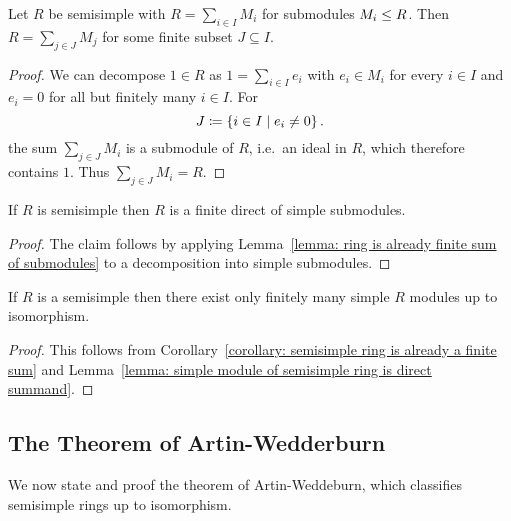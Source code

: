 \begin{lemma}
  \label{lemma: ring is already finite sum of submodules}
  Let $R$ be semisimple with $R = \sum_{i \in I} M_i$ for submodules $M_i \leq R$.
  Then $R = \sum_{j \in J} M_j$ for some finite subset $J \subseteq I$.
\end{lemma}


\begin{proof}
  We can decompose $1 \in R$ as $1 = \sum_{i \in I} e_i$ with $e_i \in M_i$ for every $i \in I$ and $e_i = 0$ for all but finitely many $i \in I$.
  For
  \[
              J
    \coloneqq  \{ i \in I \mid e_i \neq 0 \} \,.
  \]
  the sum $\sum_{j \in J} M_i$ is a submodule of $R$, i.e.\ an ideal in $R$, which therefore contains $1$.
  Thus $\sum_{j \in J} M_i = R$.
\end{proof}


\begin{corollary}
  \label{corollary: semisimple ring is already a finite sum}
  If $R$ is semisimple then $R$ is a finite direct of simple submodules.
\end{corollary}


\begin{proof}
 The claim follows by applying Lemma~\ref{lemma: ring is already finite sum of submodules} to a decomposition into simple submodules.
\end{proof}


\begin{corollary}
  If $R$ is a semisimple then there exist only finitely many simple $R$ modules up to isomorphism.
\end{corollary}


\begin{proof}
  This follows from Corollary~\ref{corollary: semisimple ring is already a finite sum} and Lemma~\ref{lemma: simple module of semisimple ring is direct summand}.
\end{proof}





\subsection{The Theorem of Artin-Wedderburn}


\begin{fluff}
  We now state and proof the theorem of Artin-Weddeburn, which classifies semisimple rings up to isomorphism.
\end{fluff}


